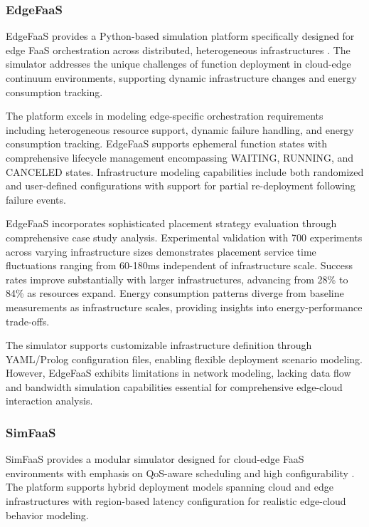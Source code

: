\subsubsection{EdgeFaaS}

EdgeFaaS provides a Python-based simulation platform specifically designed for edge FaaS orchestration across distributed, heterogeneous infrastructures \cite{li2022edgefaas}. The simulator addresses the unique challenges of function deployment in cloud-edge continuum environments, supporting dynamic infrastructure changes and energy consumption tracking.

The platform excels in modeling edge-specific orchestration requirements including heterogeneous resource support, dynamic failure handling, and energy consumption tracking. EdgeFaaS supports ephemeral function states with comprehensive lifecycle management encompassing WAITING, RUNNING, and CANCELED states. Infrastructure modeling capabilities include both randomized and user-defined configurations with support for partial re-deployment following failure events.

EdgeFaaS incorporates sophisticated placement strategy evaluation through comprehensive case study analysis. Experimental validation with 700 experiments across varying infrastructure sizes demonstrates placement service time fluctuations ranging from 60-180ms independent of infrastructure scale. Success rates improve substantially with larger infrastructures, advancing from 28\% to 84\% as resources expand. Energy consumption patterns diverge from baseline measurements as infrastructure scales, providing insights into energy-performance trade-offs.

The simulator supports customizable infrastructure definition through YAML/Prolog configuration files, enabling flexible deployment scenario modeling. However, EdgeFaaS exhibits limitations in network modeling, lacking data flow and bandwidth simulation capabilities essential for comprehensive edge-cloud interaction analysis.

\subsubsection{SimFaaS}

SimFaaS provides a modular simulator designed for cloud-edge FaaS environments with emphasis on QoS-aware scheduling and high configurability \cite{mahmoudi2021simfaas}. The platform supports hybrid deployment models spanning cloud and edge infrastructures with region-based latency configuration for realistic edge-cloud behavior modeling.

